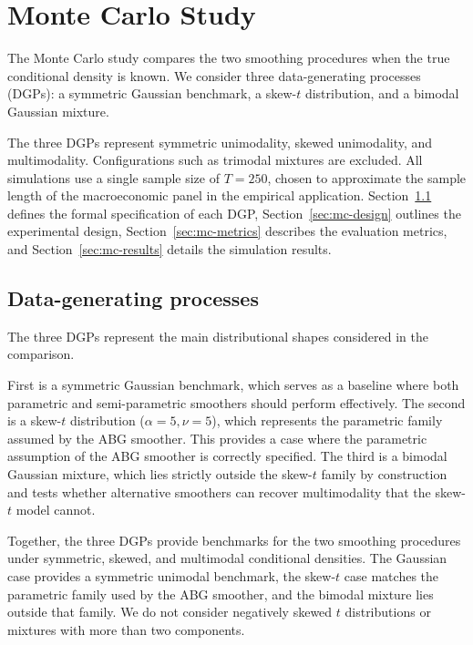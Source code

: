 \documentclass[12pt]{report} %
\begin{document}

\chapter{Monte Carlo Study}
\label{ch:mc}

The Monte Carlo study compares the two smoothing procedures when the true conditional density is known. We consider three data-generating processes (DGPs): a symmetric Gaussian benchmark, a skew-$t$ distribution, and a bimodal Gaussian mixture.

The three DGPs represent symmetric unimodality, skewed unimodality, and multimodality. Configurations such as trimodal mixtures are excluded. All simulations use a single sample size of $T = 250$, chosen to approximate the sample length of the macroeconomic panel in the empirical application. Section~\ref{sec:dgps} defines the formal specification of each DGP, Section~\ref{sec:mc-design} outlines the experimental design, Section~\ref{sec:mc-metrics} describes the evaluation metrics, and Section~\ref{sec:mc-results} details the simulation results.

\section{Data-generating processes}
\label{sec:dgps}

The three DGPs represent the main distributional shapes considered in the comparison.

First is a symmetric Gaussian benchmark, which serves as a baseline where both parametric and semi-parametric smoothers should perform effectively. The second is a skew-$t$ distribution ($\alpha = 5, \nu = 5$), which represents the parametric family assumed by the ABG smoother. This provides a case where the parametric assumption of the ABG smoother is correctly specified. The third is a bimodal Gaussian mixture, which lies strictly outside the skew-$t$ family by construction and tests whether alternative smoothers can recover multimodality that the skew-$t$ model cannot.

Together, the three DGPs provide benchmarks for the two smoothing procedures under symmetric, skewed, and multimodal conditional densities. The Gaussian case provides a symmetric unimodal benchmark, the skew-$t$ case matches the parametric family used by the ABG smoother, and the bimodal mixture lies outside that family. We do not consider negatively skewed $t$ distributions or mixtures with more than two components.
\end{document}

